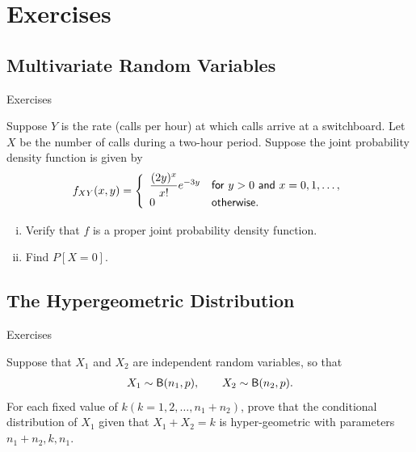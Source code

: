 


\section{Exercises}

\subsection{Multivariate Random Variables}

\begin{frame}{Exercises}

\justifying
{} Suppose $Y$ is the rate (calls per hour) at which calls arrive at a switchboard. Let $X$ be the number of calls during a two-hour period. Suppose the joint probability density function is given by
\begin{align*}
f_{XY}(x, y) = \left\{
\begin{array}{ll}
\dfrac{(2y)^x}{x!} e^{-3y} & \mathsf{for\ } y > 0 \mathsf{\ and\ } x = 0, 1, \ldots, \\
0 & \mathsf{otherwise}.
\end{array}
\right.
\end{align*}
\begin{enumerate}[(i).]
	\justifying
	\item Verify that $f$ is a proper joint probability density function.
	\item Find $P[X = 0]$.
\end{enumerate}

\end{frame}


\subsection{The Hypergeometric Distribution}


\begin{frame}{Exercises}

\justifying
{} Suppose that $X_1$ and $X_2$ are independent random variables, so that
\begin{align*}
X_1\sim \mathsf{B}(n_1, p), \qquad X_2\sim \mathsf{B}(n_2, p).
\end{align*}
For each fixed value of $k (k = 1, 2,\ldots, n_1 + n_2)$, prove that the conditional distribution of $X_1$ given that $X_1 + X_2 = k$ is hyper-geometric with parameters $n_1 + n_2, k, n_1$.

\end{frame}


